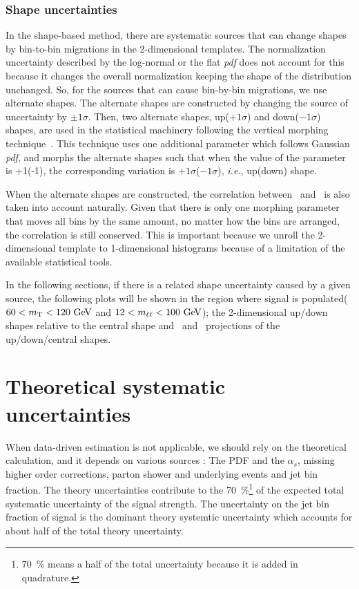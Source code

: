 \subsubsection{Shape uncertainties}

In the shape-based method, there are systematic sources that can change shapes 
by bin-to-bin migrations in the 2-dimensional templates. 
The normalization uncertainty described by the log-normal or the flat \textit{pdf}  
does not account for this because it changes the overall normalization 
keeping the shape of the distribution unchanged. So, for the sources that can cause 
bin-by-bin migrations, we use alternate shapes.  
The alternate shapes are constructed by changing the source of uncertainty 
by $\pm 1\sigma$. Then, two alternate shapes, up($+1\sigma$) and down($-1\sigma$) shapes,
are used in the statistical machinery following the vertical morphing 
technique~\cite{2011arXiv1103.0354C}. 
This technique uses one additional parameter which follows Gaussian \textit{pdf},
and morphs the alternate shapes such that when the value of the parameter 
is +1(-1), the corresponding variation is $+1\sigma$($-1\sigma$), 
\textit{i.e.}, up(down) shape. 

When the alternate shapes are constructed, 
the correlation between \mT\ and \mll\ is also taken into account naturally.  
Given that there is only one morphing parameter that moves all bins 
by the same amount,  
no matter how the bins are arranged, the correlation is still conserved.  
This is important because we unroll the 2-dimensional template to 1-dimensional 
histograms because of a limitation of the available statistical tools. 

In the following sections, if there is a related shape uncertainty
caused by a given source, the following plots will be shown 
in the region where signal is populated($60<m_{\mathrm{T}}<120~\mathrm{Ge\kern -0.1em V}$ and $12<m_{\ell\ell}<100~\mathrm{Ge\kern -0.1em V}$); 
the 2-dimensional up/down shapes relative to the central shape 
and \mT\ and \mll\ projections of the up/down/central shapes. 

\section{Theoretical systematic uncertainties}

When data-driven estimation is not applicable, we should rely on the theoretical 
calculation, and it depends on various sources : The PDF and the $\alpha_s$,  
missing higher order corrections, parton shower and underlying events 
and jet bin fraction. The theory uncertainties contribute to the 70~\%\footnote{70~\% means a half 
of the total uncertainty because it is added in quadrature.} of 
the expected total systematic uncertainty of the signal strength. 
The uncertainty on the jet bin fraction of signal is the dominant theory systemtic
uncertainty which accounts for about half of the total theory uncertainty.


